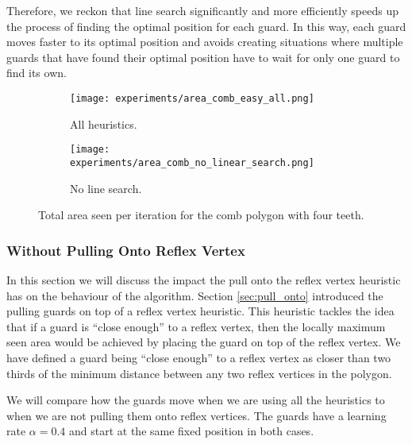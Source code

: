 Therefore, we reckon that line search significantly and more efficiently speeds up the process of finding the optimal position for each guard. In this way, each guard moves faster to its optimal position and avoids creating situations where multiple guards that have found their optimal position have to wait for only one guard to find its own.


\begin{figure}[h!]
    \centering
    \begin{subfigure}{0.45\textwidth}
        \texttt{[image: experiments/area\_comb\_easy\_all.png]}
        \caption{All heuristics.}
        \label{fig:no_line_search1}
    \end{subfigure}
    \begin{subfigure}{0.45\textwidth}
        \texttt{[image: experiments/area\_comb\_no\_linear\_search.png]}
        \caption{No line search.}
        \label{fig:no_line_search2}
    \end{subfigure}
    \caption{Total area seen per iteration for the comb polygon with four teeth.}
    \label{fig:no_line_search}
\end{figure}

\subsubsection{Without Pulling Onto Reflex Vertex}
In this section we will discuss the impact the pull onto the reflex vertex heuristic has on the behaviour of the algorithm. Section \ref{sec:pull_onto} introduced the pulling guards on top of a reflex vertex heuristic. This heuristic tackles the idea that if a guard is ``close enough'' to a reflex vertex, then the locally maximum seen area would be achieved by placing the guard on top of the reflex vertex. We have defined a guard being ``close enough'' to a reflex vertex as closer than two thirds of the minimum distance between any two reflex vertices in the polygon.

We will compare how the guards move when we are using all the heuristics to when we are not pulling them onto reflex vertices. The guards have a learning rate $\alpha = 0.4$ and start at the same fixed position in both cases.

